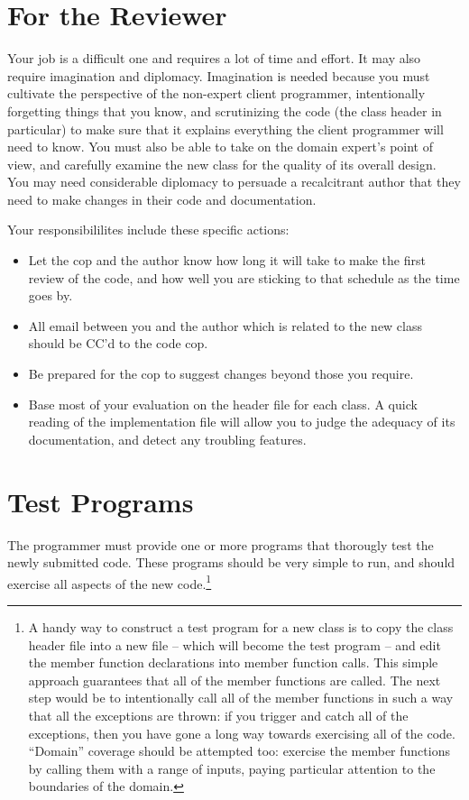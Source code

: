 \section{For the Reviewer}
Your job is a difficult one and requires a lot of time and effort.
It may also require  imagination and diplomacy.  Imagination is
needed because you must cultivate the perspective of the non-expert
client programmer, intentionally forgetting things that you know, and
scrutinizing the code (the class header in particular) to make sure
that it explains everything the client programmer will need to know.
You must also be able to take on the domain expert's point of view,
and carefully examine the new class for the quality of its overall
design.  You may need considerable diplomacy to persuade a
recalcitrant author that they need to make changes in their code and
documentation.

Your responsibililites include these specific actions:

\begin{itemize}
  \item Let the cop and the author know how long it will take to
        make the first review of the code, and how well you are
        sticking to that schedule as the time goes by.
  \item All email between you and the author which is related to the
        new class should be CC'd to the code cop.
  \item Be prepared for the cop to suggest changes beyond those you
        require.
  \item Base most of your evaluation on the header file for each 
        class.  A quick reading of the implementation file 
        will allow you to judge the adequacy of its documentation,
        and detect any troubling features.
\end{itemize}
\section{Test Programs}
The programmer must provide one or more programs that thorougly test
the newly submitted code.  These programs should be very simple to
run, and should exercise all aspects of the new code.\footnote{A handy
way to construct a test program for a new class is to copy the class
header file into a new file -- which will become the test program --
and edit the member function declarations into member function calls.
This simple approach guarantees that all of the member functions are
called.  The next step would be to intentionally call all of the
member functions in such a way that all the exceptions are thrown:
if you trigger and catch all of the exceptions, then you have gone
a long way towards exercising all of the code.  ``Domain'' coverage should
be attempted too:  exercise the member functions by calling them with a 
range of inputs, paying particular attention to the boundaries of the domain.}

